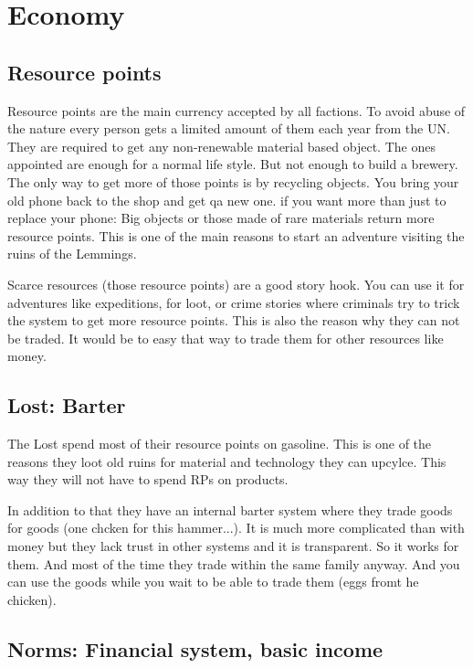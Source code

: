 \chapter{Economy}

\section{Resource points}
\label{sec:Resource points}
Resource points are the main currency accepted by all factions. To avoid abuse of the nature every person gets a limited amount of them each year from the UN. They are required to get any non-renewable material based object. The ones appointed are enough for a normal life style. But not enough to build a brewery. The only way to get more of those points is by recycling objects. You bring your old phone back to the shop and get qa new one. if you want more than just to replace your phone: Big objects or those made of rare materials return more resource points. This is one of the main reasons to start an adventure visiting the ruins of the Lemmings. 

\begin{reason}[]
    Scarce resources (those resource points) are a good story hook. You can use it for adventures like expeditions, for loot, or crime stories where criminals try to trick the system to get more resource points. This is also the reason why they can not be traded. It would be to easy that way to trade them for other resources like money.
\end{reason}

\section{Lost: Barter}

The Lost spend most of their resource points on gasoline. This is one of the reasons they loot old ruins for material and technology they can upcylce. This way they will not have to spend RPs on products.

In addition to that they have an internal barter system where they trade goods for goods (one chcken for this hammer...).
It is much more complicated than with money but they lack trust in other systems and it is transparent. So it works for them. And most of the time they trade within the same family anyway.
And you can use the goods while you wait to be able to trade them (eggs fromt he chicken).


\section{Norms: Financial system, basic income}
\label{sec:basic income}

